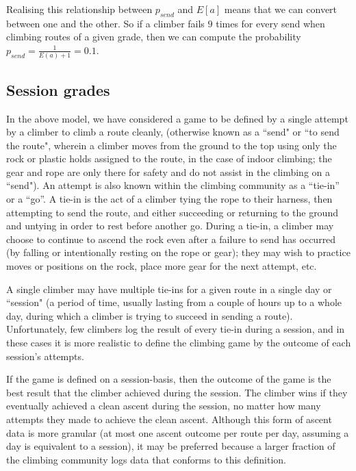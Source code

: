 \documentclass{article}
\begin{document}
{Realising this relationship between $p_{send}$ and $ E\left[a\right]$ means that we can convert between one and the other. So if a climber fails $9$ times for every send when climbing routes of a given grade, then we can compute the probability  $p_{send} = \frac{1}{E(a)+1} = 0.1$.

\subsection*{Session grades}

In the above model, we have considered a game to be defined by a single attempt by a climber to climb a route cleanly, (otherwise known as a ``send" or ``to send the route", wherein a climber moves from the ground to the top using only the rock or plastic holds assigned to the route, in the case of indoor climbing; the gear and rope are only there for safety and do not assist in the climbing on a ``send"). An attempt is also known within the climbing community as a ``tie-in'' or a ``go''. A tie-in is the act of a climber tying the rope to their harness, then attempting to send the route, and either succeeding or returning to the ground and untying in order to rest before another go.  During a tie-in, a climber may choose to continue to ascend the rock even after a failure to send has occurred (by falling or intentionally resting on the rope or gear); they may wish to practice moves or positions on the rock, place more gear for the next attempt, etc.

A single climber may have multiple tie-ins for a given route in a single day or ``session" (a period of time, usually lasting from a couple of hours up to a whole day, during which a climber is trying to succeed in sending a route).  Unfortunately, few climbers log the result of every tie-in during a session, and in these cases it is more realistic to define the climbing game by the outcome of each session's attempts.

If the game is defined on a session-basis, then the outcome of the game is the best result that the climber achieved during the session. The climber wins if they eventually achieved a clean ascent during the session, no matter how many attempts they made to achieve the clean ascent. Although this form of ascent data is more granular (at most one ascent outcome per route per day, assuming a day is equivalent to a session), it may be preferred because a larger fraction of the climbing community logs data that conforms to this definition. 

}
\end{document}
